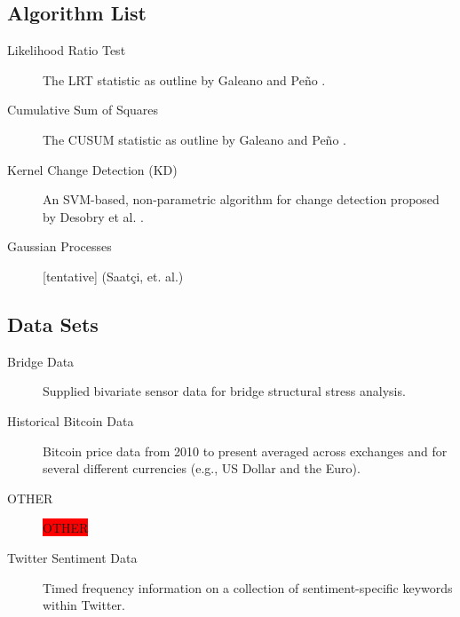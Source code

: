 \documentclass[10pt,letterpaper]{article}
\begin{document}
\subsection{Algorithm List}

\begin{description}
\item[Likelihood Ratio Test] The LRT statistic as outline by Galeano and Pe\~{n}o \cite{galeano2007covariance}.
\item[Cumulative Sum of Squares] The CUSUM statistic as outline by Galeano and Pe\~{n}o \cite{galeano2007covariance}.
\item[Kernel Change Detection (KD)] An SVM-based, non-parametric algorithm for change detection proposed by Desobry et al. \cite{1468491}.
\item[Gaussian Processes] [tentative] (Saat\c{c}i, et. al.)
\end{description}

\subsection{Data Sets}

\begin{description}
\item[Bridge Data] Supplied bivariate sensor data for bridge structural stress analysis.
\item[Historical Bitcoin Data] Bitcoin price data from 2010 to present averaged across exchanges and for several different currencies (e.g., US Dollar and the Euro).
\item[OTHER] \colorbox{red}{OTHER}
\item[Twitter Sentiment Data] Timed frequency information on a collection of sentiment-specific keywords within Twitter.
\end{description}



\end{document}
